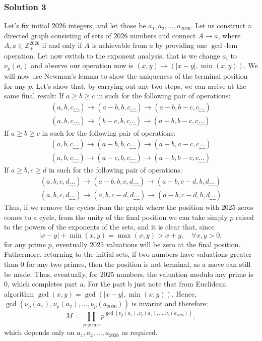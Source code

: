 \documentclass[11pt]{article}
\begin{document}
\subsubsection{Solution 3}
Let's fix initial $2026$ integers, and let those be $a_1,a_2,\dots , a_{2026}$. Let us construct a directed graph consisting of sets of $2026$ numbers and connect $A \to a$, where $A, a \in \mathbb Z_+^{2026}$ if and only if $A$ is achievable from $a$ by providing one $\gcd$-$\mathrm{lcm}$ operation. Let now switch to the exponent analysis, that is we change $a_i$ to $\nu_p(a_i)$ and observe our operation now is $(x,y) \to (|x-y|,\min(x,y))$. We will now use Newman's lemma to show the uniqueness of the terminal position for any $p$. Let’s show that, by carrying out any two steps, we can arrive at the same final result:
If $a \ge b \ge c$ in such for the following pair of operations:
\[
\begin{aligned}
(a,b,c\underbrace{...}) \to (a-b,b,c\underbrace{...}) \to (a-b,b-c,c\underbrace{...}) 
\\
(a,b,c\underbrace{...}) \to (b-c,b,c\underbrace{...}) \to (a-b,b-c,c\underbrace{...}) 
\end{aligned}
\]
If $a \ge b \ge c$ in such for the following pair of operations:
\[
\begin{aligned}
(a,b,c\underbrace{...}) \to (a-b,b,c\underbrace{...}) \to (a-b,a-c,c\underbrace{...}) 
\\
(a,b,c\underbrace{...}) \to (a-c,b,c\underbrace{...}) \to (a-b,b-c,c\underbrace{...}) 
\end{aligned}
\]
If $a \ge b, c \ge d$ in such for the following pair of operations:
\[
\begin{aligned}
(a,b,c,d\underbrace{...}) \to (a-b,b,c,d\underbrace{...}) \to (a-b,c-d,b,d\underbrace{...}) 
\\
(a,b,c,d\underbrace{...}) \to (a,b,c-d,d \underbrace{...}) \to (a-b,c-d,b,d\underbrace{...})
\end{aligned}
\]
Thus, if we remove the cycles from the graph where the position with $2025$ zeros comes to a cycle, from the unity of the final position we can take simply $p$ raised to the powers of the exponents of the sets, and it is clear that, since $$|x-y|+\min (x,y)=\max (x, y) > x+y, \quad \forall x,y>0,$$ for any prime $p$, eventually $2025$ valuations will be zero at the final position. Futhermore, returning to the initial sets, if two numbers have valuations greater than $0$ for any two primes, then the position is not terminal, as a move can still be made. Thus, eventually, for $2025$ numbers, the valuation modulo any prime is $0$, which completes part a. For the part b just note that from Euclidean algorithm $\gcd (x,y) = \gcd (|x-y|,\min (x,y))$. Hence, \(\gcd(\nu_p(a_1),\nu_p(a_2),\ldots,\nu_p(a_{2026}))\) is invarint and therefore:
$$M = \prod_{p\text{ prime}}^{}p^{\gcd(\nu_p(a_1),\nu_p(a_2),\ldots,\nu_p(a_{2026}))},$$which depends only on $a_1,a_2,\dots , a_{2026}$ as required. 
\end{document}

